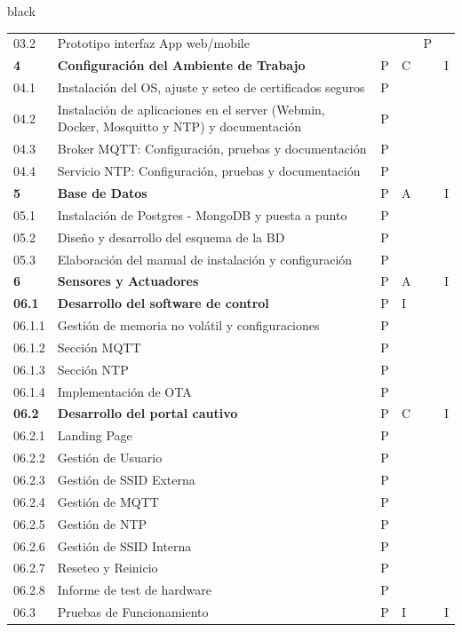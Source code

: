 \documentclass[11pt]{charter}
\begin{document}
\begin{landscape}
\begin{consigna}{black}
\begin{tabularx}{\linewidth}{@{}|p{1.3cm}|p{9.3cm}|p{3cm}|p{3cm}|p{3cm}|p{3cm}|@{}}
03.2 & Prototipo interfaz App web/mobile &  &  & P &  \\
\textbf{4} & \textbf{Configuración del Ambiente de   Trabajo} & P & C &  & I \\
04.1 & Instalación del OS, ajuste y seteo de   certificados seguros & P &  &  &  \\
04.2 & Instalación de aplicaciones en el server   (Webmin, Docker, Mosquitto y NTP) y documentación & P &  &  &  \\
04.3 & Broker MQTT: Configuración, pruebas y   documentación & P &  &  &  \\
04.4 & Servicio NTP: Configuración, pruebas y   documentación & P &  &  &  \\
\textbf{5} & \textbf{Base de Datos} & P & A &  & I \\
05.1 & Instalación de Postgres - MongoDB y puesta a   punto & P &  &  &  \\
05.2 & Diseño y desarrollo del esquema de la BD & P &  &  &  \\
05.3 & Elaboración del manual de instalación y   configuración & P &  &  &  \\
\textbf{6} & \textbf{Sensores y Actuadores} & P & A &  & I \\
\textbf{06.1} & \textbf{Desarrollo del software de control} & P & I &  &  \\
06.1.1 & Gestión de memoria no volátil   y configuraciones & P &  &  &  \\
06.1.2 & Sección MQTT & P &  &  &  \\
06.1.3 & Sección NTP & P &  &  &  \\
06.1.4 & Implementación de OTA & P &  &  &  \\
\textbf{06.2} & \textbf{Desarrollo del portal cautivo} & P & C &  & I \\
06.2.1 & Landing Page & P &  &  &  \\
06.2.2 & Gestión de Usuario & P &  &  &  \\
06.2.3 & Gestión de SSID Externa & P &  &  &  \\
06.2.4 & Gestión de MQTT & P &  &  &  \\
06.2.5 & Gestión de NTP & P &  &  &  \\
06.2.6 & Gestión de SSID Interna & P &  &  &  \\
06.2.7 & Reseteo y Reinicio & P &  &  &  \\
06.2.8 & Informe de test de hardware & P &  &  &  \\
06.3 & Pruebas de Funcionamiento & P & I &  & I \\

\end{tabularx}
\end{consigna}
\end{landscape}
\end{document}
